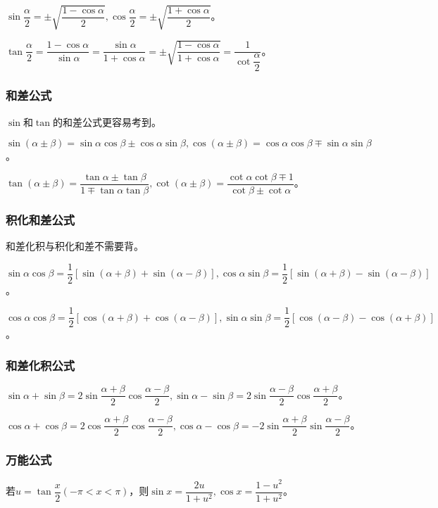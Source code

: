 \documentclass[UTF8, 12pt]{ctexart}
\begin{document}
$\sin\dfrac{\alpha}{2}=\pm\sqrt{\dfrac{1-\cos\alpha}{2}},\cos\dfrac{\alpha}{2}=\pm\sqrt{\dfrac{1+\cos\alpha}{2}}$。

$\tan\dfrac{\alpha}{2}=\dfrac{1-\cos\alpha}{\sin\alpha}=\dfrac{\sin\alpha}{1+\cos\alpha}=\pm\sqrt{\dfrac{1-\cos\alpha}{1+\cos\alpha}}=\dfrac{1}{\cot\dfrac{\alpha}{2}}$。

\subsubsection{和差公式}

$\sin$和$\tan$的和差公式更容易考到。

$\sin(\alpha\pm\beta)=\sin\alpha\cos\beta\pm\cos\alpha\sin\beta,\cos(\alpha\pm\beta)=\cos\alpha\cos\beta\mp\sin\alpha\sin\beta$。

$\tan(\alpha\pm\beta)=\dfrac{\tan\alpha\pm\tan\beta}{1\mp\tan\alpha\tan\beta},\cot(\alpha\pm\beta)=\dfrac{\cot\alpha\cot\beta\mp 1}{\cot\beta\pm\cot\alpha}$。

\subsubsection{积化和差公式}

和差化积与积化和差不需要背。

$\sin\alpha\cos\beta=\dfrac{1}{2}[\sin(\alpha+\beta)+\sin(\alpha-\beta)],\cos\alpha\sin\beta=\dfrac{1}{2}[\sin(\alpha+\beta)-\sin(\alpha-\beta)]$。

$\cos\alpha\cos\beta=\dfrac{1}{2}[\cos(\alpha+\beta)+\cos(\alpha-\beta)],\sin\alpha\sin\beta=\dfrac{1}{2}[\cos(\alpha-\beta)-\cos(\alpha+\beta)]$。

\subsubsection{和差化积公式}

$\sin\alpha+\sin\beta=2\sin\dfrac{\alpha+\beta}{2}\cos\dfrac{\alpha-\beta}{2},\sin\alpha-\sin\beta=2\sin\dfrac{\alpha-\beta}{2}\cos\dfrac{\alpha+\beta}{2}$。

$\cos\alpha+\cos\beta=2\cos\dfrac{\alpha+\beta}{2}\cos\dfrac{\alpha-\beta}{2},\cos\alpha-\cos\beta=-2\sin\dfrac{\alpha+\beta}{2}\sin\dfrac{\alpha-\beta}{2}$。

\subsubsection{万能公式}

若$u=\tan\dfrac{x}{2}(-\pi<x<\pi)$，则$\sin x=\dfrac{2u}{1+u^2},\cos x=\dfrac{1-u^2}{1+u^2}$。
\end{document}

